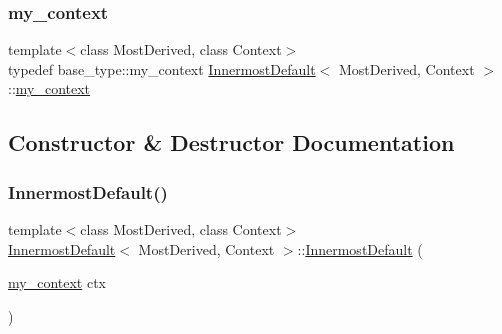 \mbox{\label{struct_innermost_default_a0aab337364dec3101e80f293b709d53d}} 
\subsubsection{\texorpdfstring{my\+\_\+context}{my\_context}}
{\footnotesize\ttfamily template$<$class Most\+Derived, class Context$>$ \\
typedef base\+\_\+type\+::my\+\_\+context \mbox{\hyperlink{struct_innermost_default}{Innermost\+Default}}$<$ Most\+Derived, Context $>$\+::\mbox{\hyperlink{struct_innermost_default_a0aab337364dec3101e80f293b709d53d}{my\+\_\+context}}}



\subsection{Constructor \& Destructor Documentation}
\mbox{\label{struct_innermost_default_ac1a90ebc7db2bccb09cbcd098e319944}} 
\subsubsection{\texorpdfstring{Innermost\+Default()}{InnermostDefault()}}
{\footnotesize\ttfamily template$<$class Most\+Derived, class Context$>$ \\
\mbox{\hyperlink{struct_innermost_default}{Innermost\+Default}}$<$ Most\+Derived, Context $>$\+::\mbox{\hyperlink{struct_innermost_default}{Innermost\+Default}} (\begin{DoxyParamCaption}\item[{\mbox{\hyperlink{struct_innermost_default_a0aab337364dec3101e80f293b709d53d}{my\+\_\+context}}}]{ctx }\end{DoxyParamCaption})\hspace{0.3cm}{\ttfamily [inline]}}

\mbox{\label{struct_innermost_default_ab2d1dda2c58305deca92d83ca2d5e2c9}} 
